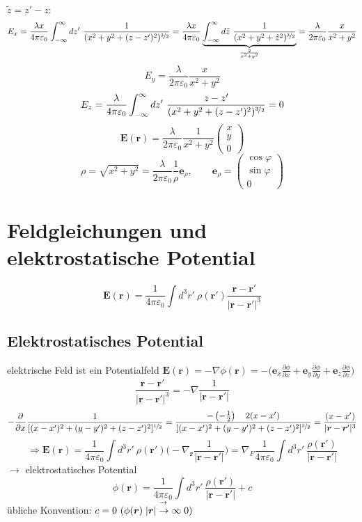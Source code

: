 \documentclass[titlepage,11pt,a4paper,ngerman]{report}
\newcommand{\prt}[2]{\frac{\partial #1}{\partial #2}}
\newcommand{\kq}{\frac{1}{4\pi\epsilon_0}}
\newcommand{\intt}[2]{\int_{#1}^{#2}}
\renewcommand{\vec}[1]{\boldsymbol{#1}}
\renewcommand{\epsilon}{\varepsilon}
\begin{document}
\\
$\tilde{z} = z' - z$:
$$E_x = \frac{\lambda x}{4 \pi \epsilon_0}\intt{-\infty}{\infty}dz'\ \frac{1}{(x^2 + y^2 + (z-z')^2)^{\nicefrac{3}{2}}} = \frac{\lambda x}{4 \pi \epsilon_0}\underbrace{\intt{-\infty}{\infty}d\tilde{z}\ \frac{1}{(x^2 + y^2 + \tilde{z}^2)^{\nicefrac{3}{2}}}}_{\frac{2}{x^2 + y^2}} = \frac{\lambda}{2 \pi \epsilon_0} \frac{x}{x^2 + y^2}$$
$$E_y = \frac{\lambda}{2 \pi \epsilon_0}\frac{x}{x^2 + y^2}$$
$$E_z = \frac{\lambda}{4 \pi \epsilon_0} \intt{-\infty}{\infty}dz'\ \frac{z-z'}{(x^2 + y^2 + (z-z')^2)^{\nicefrac{3}{2}}} = 0$$
$$\vec{E}(\vec{r}) = \frac{\lambda}{2 \pi \epsilon_0} \frac{1}{x^2 + y^2} \begin{pmatrix}x\\ y\\ 0\end{pmatrix}$$
$$\rho = \sqrt{x^2 + y^2} = \frac{\lambda}{2 \pi \epsilon_0} \frac{1}{\rho}\vec{e}_\rho, \qquad \vec{e}_\rho = \begin{pmatrix}\cos \varphi\\ \sin \varphi\\ 0\end{pmatrix}$$

\section{Feldgleichungen und elektrostatische Potential}

$$\vec{E}(\vec{r}) = \kq \int d^3 r'\ \rho(\vec{r}') \frac{\vec{r} - \vec{r}'}{|\vec{r} - \vec{r}'|^3}$$

\subsection{Elektrostatisches Potential}

elektrische Feld ist ein Potentialfeld $\vec{E}(\vec{r}) = - \nabla\phi(\vec{r}) = - \bigg( \vec{e}_x \prt{\phi}{x} + \vec{e}_y \prt{\phi}{y} + \vec{e}_z \prt{\phi}{z}\bigg)$
$$\frac{\vec{r} - \vec{r}'}{|\vec{r} - \vec{r}'|^3} = -\nabla\frac{1}{|\vec{r}-\vec{r}'|}$$
$$-\prt{}{x} \frac{1}{[(x-x')^2 + (y-y')^2 + (z-z')^2]^{\nicefrac{1}{2}}} =  \frac{- \left(-\frac{1}{2}\right) \quad 2(x-x')}{[(x-x')^2 + (y-y')^2 + (z-z')^2]^{\nicefrac{3}{2}}} = \frac{(x-x')}{|\vec{r} - \vec{r}'|^3}$$
$$\Rightarrow \vec{E}(\vec{r}) = \kq \int d^3 r'\ \rho(\vec{r}') \bigg(-\nabla_{\vec{r}} \frac{1}{|\vec{r} - \vec{r}'|} \bigg) = \nabla_F \kq \int d^3 r'\ \frac{\rho(\vec{r}')}{|\vec{r} - \vec{r}'|}$$
$\rightarrow$ elektrostatisches Potential
$$\phi(\vec{r}) = \kq \int d^3 r'\ \frac{\rho(\vec{r}')}{|\vec{r} - \vec{r}'|} + c$$
übliche Konvention: $c = 0\ (\phi(\vec{r})\buildrel{\rightarrow}\over{|\vec{r}| \to \infty} 0)$
\end{document}
